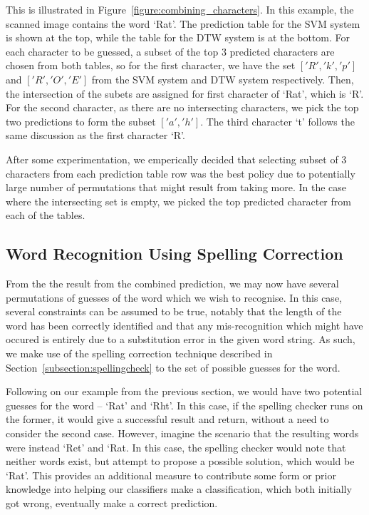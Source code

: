 \documentclass[12pt]{article}
\begin{document}
	
	This is illustrated in Figure~\ref{figure:combining_characters}. In this example, the scanned image contains the word `Rat'. The prediction table for the SVM system is shown at the top, while the table for the DTW system is at the bottom. For each character to be guessed, a subset of the top 3 predicted characters are chosen from both tables, so for the first character, we have the set $['R', 'k', 'p']$ and $['R', 'O', 'E']$ from the SVM system and DTW system respectively. Then, the intersection of the subets are assigned for first character of `Rat', which is `R'. For the second character, as there are no intersecting characters, we pick the top two predictions to form the subset $['a', 'h']$. The third character `t' follows the same discussion as the first character `R'.
	
	After some experimentation, we emperically decided that selecting subset of 3 characters from each prediction table row was the best policy due to potentially large number of permutations that might result from taking more. In the case where the intersecting set is empty, we picked the top predicted character from each of the tables.
	
\subsection{Word Recognition Using Spelling Correction}
	\label{subsection:experiments:combinedword}
	From the the result from the combined prediction, we may now have several permutations of guesses of the word which we wish to recognise. In this case, several constraints can be assumed to be true, notably that the length of the word has been correctly identified and that any mis-recognition which might have occured is entirely due to a substitution error in the given word string. As such, we make use of the spelling correction technique described in Section~\ref{subsection:spellingcheck} to the set of possible guesses for the word.  
	
	Following on our example from the previous section, we would have two potential guesses for the word -- `Rat' and `Rht'. In this case, if the spelling checker runs on the former, it would give a successful result and return, without a need to consider the second case. However, imagine the scenario that the resulting words were instead `Ret' and `Rat. In this case, the spelling checker would note that neither words exist, but attempt to propose a possible solution, which would be `Rat'. This provides an additional measure to contribute some form or prior knowledge into helping our classifiers make a classification, which both initially got wrong, eventually make a correct prediction.
	
\end{document}

